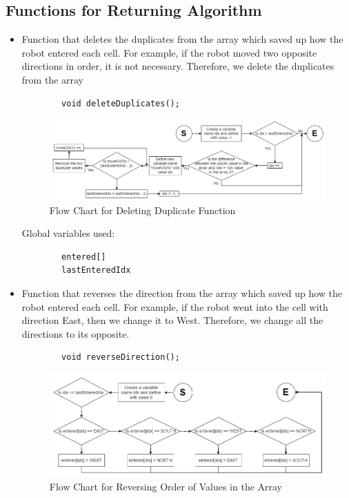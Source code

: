 \documentclass[11pt]{article}
\begin{document}

\subsection{Functions for Returning Algorithm}
\begin{itemize}
\item Function that deletes the duplicates from the array which saved up how the robot entered each cell. For example, if the robot moved two opposite directions in order, it is not necessary. Therefore, we delete the duplicates from the array
 	\begin{verbatim}
		void deleteDuplicates();
	\end{verbatim}
\begin{figure}[htp]
\centering
\includegraphics[scale=0.50]{images/Software_Flowchart/deleteDuplicate.png}
\caption{Flow Chart for Deleting Duplicate Function}
\label{}
\end{figure}
Global variables used:
 	\begin{verbatim}
		entered[]
		lastEnteredIdx
	\end{verbatim}

\item Function that reverses the direction from the array which saved up how the robot entered each cell. For example, if the robot went into the cell with direction East, then we change it to West. Therefore, we change all the directions to its opposite.
 	\begin{verbatim}
		void reverseDirection();
	\end{verbatim}
\begin{figure}[htp]
\centering
\includegraphics[scale=0.50]{images/Software_Flowchart/reverseDirection.png}
\caption{Flow Chart for Reversing Order of Values in the Array}
\label{}
\end{figure}


\end{itemize}
\end{document}
